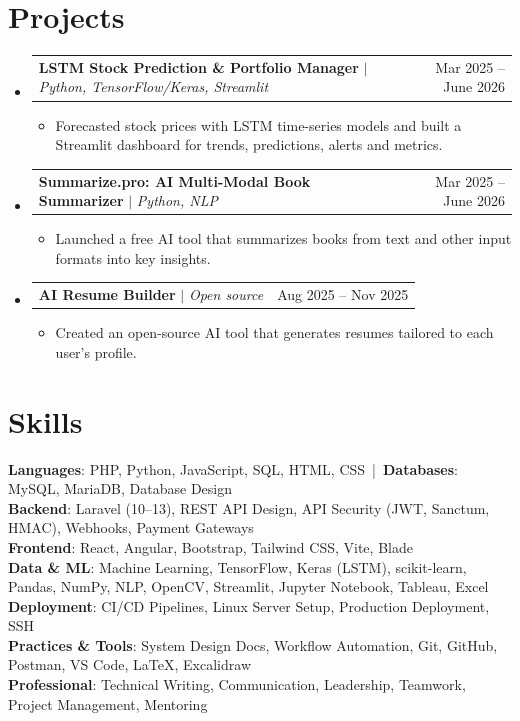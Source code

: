 \documentclass[a4paper,11pt]{article}
\makeatletter
\newcommand{\resumeItem}[1]{\item\small{#1\vspace{-2pt}}}
\newcommand{\resumeProjectHeading}[2]{
  \item
  \begin{tabular*}{\textwidth}{l@{\extracolsep{\fill}}r}
    \small #1 & \small #2 \\
  \end{tabular*}\vspace{-7pt}}
\newcommand{\resumeSubHeadingListStart}{\begin{itemize}[leftmargin=0.0in, label={}]}
\newcommand{\resumeSubHeadingListEnd}{\end{itemize}}
\newcommand{\resumeItemListStart}{\begin{itemize}[leftmargin=0.18in, itemsep=0pt, parsep=0pt, topsep=2pt]}
\newcommand{\resumeItemListEnd}{\end{itemize}\vspace{-5pt}}
\makeatother
\begin{document}
\section{Projects}
\resumeSubHeadingListStart
  \resumeProjectHeading
    {\textbf{LSTM Stock Prediction \& Portfolio Manager} $|$ \emph{Python, TensorFlow/Keras, Streamlit}}{Mar 2025 -- June 2026}
    \resumeItemListStart
      \resumeItem{Forecasted stock prices with LSTM time-series models and built a Streamlit dashboard for trends,
        predictions, alerts and metrics.}
    \resumeItemListEnd
  \resumeProjectHeading
    {\textbf{Summarize.pro: AI Multi-Modal Book Summarizer} $|$ \emph{Python, NLP}}{Mar 2025 -- June 2026}
    \resumeItemListStart
      \resumeItem{Launched a free AI tool that summarizes books from text and other input formats into key insights.}
    \resumeItemListEnd
  \resumeProjectHeading
    {\textbf{AI Resume Builder} $|$ \emph{Open source}}{Aug 2025 -- Nov 2025}
    \resumeItemListStart
      \resumeItem{Created an open-source AI tool that generates resumes tailored to each user's profile.}
    \resumeItemListEnd
\resumeSubHeadingListEnd

\section{Skills}
\begin{itemize}[leftmargin=0in, label={}]
  \small{\item{
    \textbf{Languages}: PHP, Python, JavaScript, SQL, HTML, CSS \,|\, \textbf{Databases}: MySQL, MariaDB, Database Design \\
    \textbf{Backend}: Laravel (10--13), REST API Design, API Security (JWT, Sanctum, HMAC), Webhooks, Payment Gateways \\
    \textbf{Frontend}: React, Angular, Bootstrap, Tailwind CSS, Vite, Blade \\
    \textbf{Data \& ML}: Machine Learning, TensorFlow, Keras (LSTM), scikit-learn, Pandas, NumPy, NLP, OpenCV, Streamlit, Jupyter Notebook, Tableau, Excel \\
    \textbf{Deployment}: CI/CD Pipelines, Linux Server Setup, Production Deployment, SSH \\
    \textbf{Practices \& Tools}: System Design Docs, Workflow Automation, Git, GitHub, Postman, VS Code, LaTeX, Excalidraw \\
    \textbf{Professional}: Technical Writing, Communication, Leadership, Teamwork, Project Management, Mentoring
  }}
\end{itemize}
\end{document}
